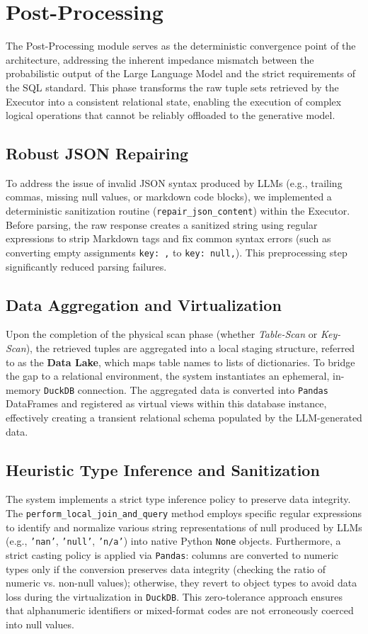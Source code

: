 \section{Post-Processing}

The Post-Processing module serves as the deterministic convergence point of the architecture, addressing the inherent impedance mismatch between the probabilistic output of the Large Language Model and the strict requirements of the SQL standard. This phase transforms the raw tuple sets retrieved by the Executor into a consistent relational state, enabling the execution of complex logical operations that cannot be reliably offloaded to the generative model.

\subsection{Robust JSON Repairing}
To address the issue of invalid JSON syntax produced by LLMs (e.g., trailing commas, missing null values, or markdown code blocks), we implemented a deterministic sanitization routine (\texttt{repair\_json\_content}) within the Executor. Before parsing, the raw response creates a sanitized string using regular expressions to strip Markdown tags and fix common syntax errors (such as converting empty assignments \texttt{key: ,} to \texttt{key: null,}). This preprocessing step significantly reduced parsing failures.

\subsection{Data Aggregation and Virtualization}
Upon the completion of the physical scan phase (whether \textit{Table-Scan} or \textit{Key-Scan}), the retrieved tuples are aggregated into a local staging structure, referred to as the \textbf{Data Lake}, which maps table names to lists of dictionaries. To bridge the gap to a relational environment, the system instantiates an ephemeral, in-memory \texttt{DuckDB} connection. The aggregated data is converted into \texttt{Pandas} DataFrames and registered as virtual views within this database instance, effectively creating a transient relational schema populated by the LLM-generated data.

\subsection{Heuristic Type Inference and Sanitization}
The system implements a strict type inference policy to preserve data integrity. The \texttt{perform\_local\_join\_and\_query} method employs specific regular expressions to identify and normalize various string representations of null produced by LLMs (e.g., \texttt{'nan'}, \texttt{'null'}, \texttt{'n/a'}) into native Python \texttt{None} objects. Furthermore, a strict casting policy is applied via \texttt{Pandas}: columns are converted to numeric types only if the conversion preserves data integrity (checking the ratio of numeric vs. non-null values); otherwise, they revert to object types to avoid data loss during the virtualization in \texttt{DuckDB}. This zero-tolerance approach ensures that alphanumeric identifiers or mixed-format codes are not erroneously coerced into null values.

